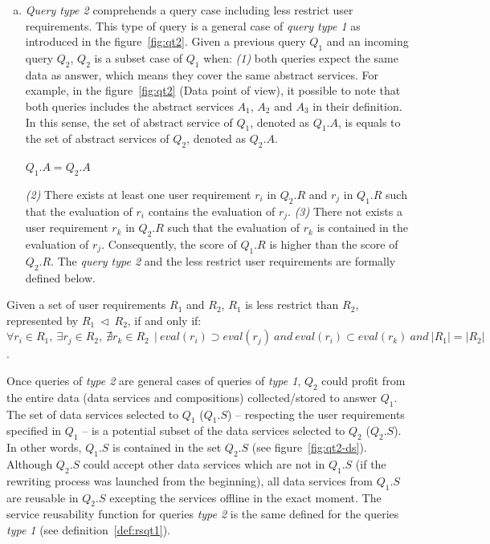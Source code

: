 \begin{enumerate}[b)]
\item \textit{Query type 2} comprehends a query case including less restrict user requirements.  
This type of query is a general case of \textit{query type 1} as introduced in the figure~\ref{fig:qt2}.
Given a previous query $Q_{1}$ and an incoming query $Q_{2}$, $Q_{2}$ is a subset case of $Q_{1}$ when: \textit{(1)} both queries expect the same data as answer, which means they cover the same abstract services. 
For example, in the figure~\ref{fig:qt2} (Data point of view), it possible to note that both queries includes the abstract services $A_{1}$, $A_{2}$ and $A_{3}$ in their definition.
In this sense, the set of abstract service of $Q_{1}$, denoted as $Q_{1}.A$, is equals to the set of abstract services of $Q_{2}$, denoted as $Q_{2}.A$.  
%
\begin{center}
$Q_{1}.A = Q_{2}.A$
\end{center}
%
\textit{(2)} There exists at least one user requirement $r_{i}$ in $Q_{2}.R$ and $r_{j}$ in $Q_{1}.R$ such that the evaluation of $r_{i}$ contains the evaluation of $r_{j}$. 
\textit{(3)} There not exists a user requirement $r_{k}$ in $Q_{2}.R$ such that the evaluation of $r_{k}$ is contained in the evaluation of $r_{j}$.
Consequently, the score of $Q_{1}.R$ is higher than the score of $Q_{2}.R$. 
The \textit{query type 2} and the less restrict user requirements are formally defined below.
\end{enumerate}

\begin{definition}
Given a set of user requirements $R_{1}$ and $R_{2}$, $R_{1}$ is less restrict than $R_{2}$, represented by $R_{1} \ \lhd \ R_{2}$, if and only if: 
$\forall r_{i} \in R_{1}, \ \exists r_{j} \in R_{2}, \ \nexists r_{k} \in R_{2} \ \ \vert \ eval (r_{i}) \supset eval(r_{j}) \ and \ eval (r_{i}) \subset eval(r_{k}) \ and \ \vert R_{1} \vert = \vert R_{2} \vert$.
\end{definition}

Once queries of \textit{type 2} are general cases of queries of \textit{type 1}, $Q_{2}$ could profit from the entire data (data services and compositions) collected/stored to answer $Q_{1}$. 
The set of data services selected to $Q_{1}$ ($Q_{1}.S$) -- respecting the user requirements specified in $Q_{1}$ -- is a potential subset of the data services selected to $Q_{2}$ ($Q_{2}.S$).
In other words, $Q_{1}.S$ is contained in the set $Q_{2}.S$ (see figure~\ref{fig:qt2-ds}).
Although $Q_{2}.S$ could accept other data services which are not in $Q_{1}.S$ (if the rewriting process was launched from the beginning), all data services from $Q_{1}.S$ are reusable in $Q_{2}.S$ excepting the services offline in the exact moment. 
The service reusability function for queries \textit{type 2} is the same defined for the queries \textit{type 1} (see definition~\ref{def:rsqt1}).

